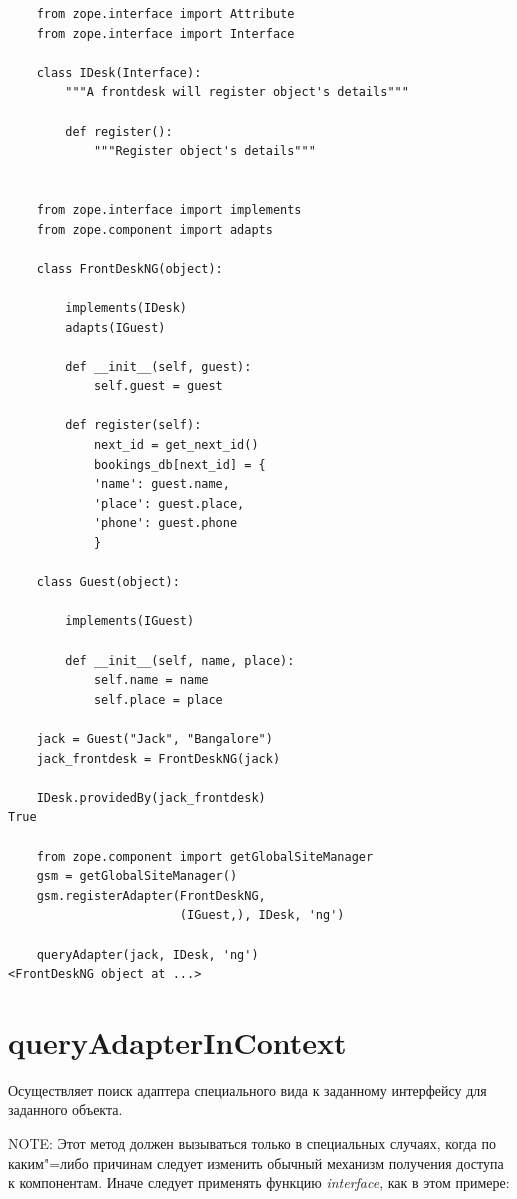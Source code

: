 \documentclass[a4paper,openany,twoside,draft]{book}
\providecommand*{\DUroletitlereference}[1]{\textsl{#1}}
\begin{document}
\begin{verbatim}
    from zope.interface import Attribute
    from zope.interface import Interface

    class IDesk(Interface):
        """A frontdesk will register object's details"""

        def register():
            """Register object's details"""


    from zope.interface import implements
    from zope.component import adapts

    class FrontDeskNG(object):

        implements(IDesk)
        adapts(IGuest)

        def __init__(self, guest):
            self.guest = guest

        def register(self):
            next_id = get_next_id()
            bookings_db[next_id] = {
            'name': guest.name,
            'place': guest.place,
            'phone': guest.phone
            }

    class Guest(object):

        implements(IGuest)

        def __init__(self, name, place):
            self.name = name
            self.place = place

    jack = Guest("Jack", "Bangalore")
    jack_frontdesk = FrontDeskNG(jack)

    IDesk.providedBy(jack_frontdesk)
True

    from zope.component import getGlobalSiteManager
    gsm = getGlobalSiteManager()
    gsm.registerAdapter(FrontDeskNG,
                        (IGuest,), IDesk, 'ng')

    queryAdapter(jack, IDesk, 'ng')
<FrontDeskNG object at ...>
\end{verbatim}


\section*{queryAdapterInContext%
  \label{queryadapterincontext}%
}

Осуществляет поиск адаптера специального вида к заданному интерфейсу для заданного объекта.

NOTE: Этот метод должен вызываться только в специальных случаях, когда по каким"=либо причинам следует изменить обычный механизм получения доступа к компонентам.  Иначе следует применять функцию \DUroletitlereference{interface}, как в этом примере:
\end{document}

